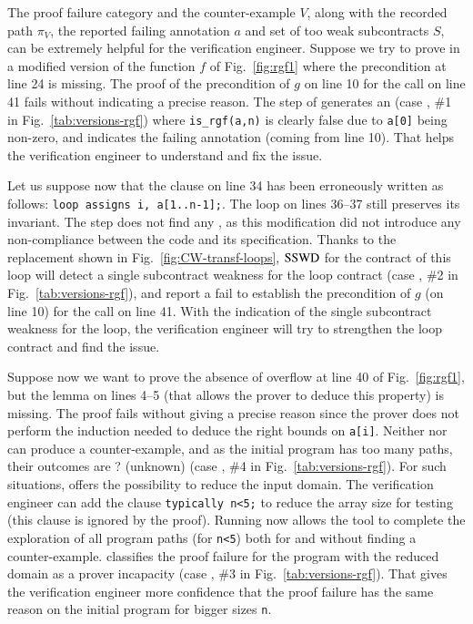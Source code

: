 The proof failure category and the counter-example $V$, along with  
the recorded path $\pi_V$,
the reported failing annotation $a$ and set of too weak subcontracts $S$,
can be extremely helpful for the verification engineer.
Suppose we try to prove in \Wp a modified version of the function $f$ of
Fig.~\ref{fig:rgf1}
where the precondition at line 24 is missing.
The proof of the precondition of $g$ on line 10 for the call on line 41
fails without indicating a precise reason.
The \NCD step of \stady  generates an \NCCE (case ,
\#1 in Fig.~\ref{tab:versions-rgf}) where \lstinline'is_rgf(a,n)'
is clearly false due to \lstinline'a[0]' being non-zero, and indicates the
failing annotation (coming from line 10).  
That helps the verification engineer to understand and fix the issue. 



Let us suppose now that the clause on line 34 has been erroneously
written as follows: \lstinline'loop assigns i, a[1..n-1];'.
The loop on lines 36--37 still preserves its invariant.
The \NCD step does not find any \NCCE, as this modification did not introduce
any non-compliance between the code and its specification.
Thanks to the replacement shown in Fig.~\ref{fig:CW-transf-loops},
$\mathrm{SSWD}$ for the contract of this loop will detect a single
subcontract weakness for the loop contract (case ,
\#2 in Fig.~\ref{tab:versions-rgf}),
and report a fail to establish the 
precondition of $g$ (on line 10) for the call on line 41.
With the indication of the single subcontract weakness for the loop, 
the verification engineer will try to strengthen the loop contract
and find the issue. 



Suppose now we want to prove the absence of overflow at line 40
of Fig.~\ref{fig:rgf1}, but the lemma on lines 4--5 
(that allows the prover to deduce this property) is missing.
The proof fails  without giving a precise reason since
the prover does not perform the induction needed to deduce the right bounds on
\lstinline'a[i]'.
Neither \NCD nor \CWD can produce a counter-example, and
as the initial program has too many paths, their outcomes are \textsf{?}
(unknown) (case , \#4 in Fig.~\ref{tab:versions-rgf}).
For such situations, \stady offers the possibility to reduce the input domain.
The verification engineer can add the \acsl clause 
\lstinline'typically n<5;' to reduce the array size 
for testing (this clause is ignored by the proof). 
Running \stady now allows the tool to complete the exploration of all
program paths (for \lstinline'n<5') both for \NCD and \CWD without finding a counter-example.
\stady classifies the proof failure for the program with 
the reduced domain as a prover incapacity (case ,
\#3 in Fig.~\ref{tab:versions-rgf}).
That gives the verification engineer more confidence that the proof failure
has the same reason on the initial program for bigger sizes \lstinline{n}.

